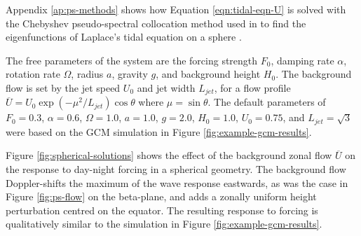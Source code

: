 
Appendix \ref{ap:ps-methods} shows how Equation \ref{eqn:tidal-eqn-U} is solved with the Chebyshev pseudo-spectral collocation method used in \citet{wang2016hough} to find the eigenfunctions of Laplace's tidal equation on a sphere \citep{longuet1968tidal, dunkerton1990laplace}.

The free parameters of the system are the forcing strength $F_{0}$, damping rate $\alpha$, rotation rate $\Omega$, radius $a$, gravity $g$, and background height $H_{0}$. The background flow is set by the jet speed $U_{0}$ and jet width $L_{jet}$, for a flow profile $\overline{U} = U_{0} \exp(-\mu^{2}/L_{jet}) \cos \theta$ where $\mu = \sin \theta$. The default parameters of $F_{0} = 0.3$, $\alpha = 0.6$, $\Omega = 1.0$, $a = 1.0$, $g = 2.0$, $H_{0} = 1.0$, $U_{0} = 0.75$, and $L_{jet} = \sqrt{3}$ were based on the GCM simulation in Figure \ref{fig:example-gcm-results}.

Figure \ref{fig:spherical-solutions} shows the effect of the background zonal flow $\overline{U}$ on the response to day-night forcing in a spherical geometry. The background flow Doppler-shifts the maximum of the wave response eastwards, as was the case in Figure \ref{fig:ps-flow} on the beta-plane, and adds a zonally uniform height perturbation centred on the equator. The resulting response to forcing is qualitatively similar to the simulation in Figure \ref{fig:example-gcm-results}.


